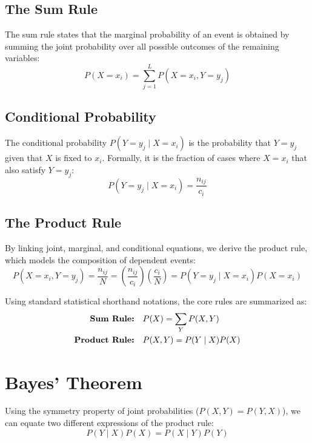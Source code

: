 \documentclass[11pt,a4paper]{article}
\begin{document}
\subsection{The Sum Rule}
The sum rule states that the marginal probability of an event is obtained by summing the joint probability over all possible outcomes of the remaining variables:
\begin{equation}
P(X=x_i) = \sum_{j=1}^{L} P(X=x_i, Y=y_j)
\end{equation}

\subsection{Conditional Probability}
The conditional probability $P(Y=y_j \mid X=x_i)$ is the probability that $Y = y_j$ given that $X$ is fixed to $x_i$. Formally, it is the fraction of cases where $X=x_i$ that also satisfy $Y=y_j$:
\begin{equation}
P(Y=y_j \mid X=x_i) = \frac{n_{ij}}{c_i}
\end{equation}

\subsection{The Product Rule}
By linking joint, marginal, and conditional equations, we derive the product rule, which models the composition of dependent events:
\begin{equation}
P(X=x_i, Y=y_j) = \frac{n_{ij}}{N} = \left(\frac{n_{ij}}{c_i}\right) \left(\frac{c_i}{N}\right) = P(Y=y_j \mid X=x_i)P(X=x_i)
\end{equation}

Using standard statistical shorthand notations, the core rules are summarized as:
\begin{align}
\text{\textbf{Sum Rule:}} \quad & P(X) = \sum_{Y} P(X, Y) \\
\text{\textbf{Product Rule:}} \quad & P(X, Y) = P(Y \mid X)P(X)
\end{align}

\section{Bayes' Theorem}
Using the symmetry property of joint probabilities ($P(X, Y) = P(Y, X)$), we can equate two different expressions of the product rule:
\begin{equation}
P(Y \mid X)P(X) = P(X \mid Y)P(Y)
\end{equation}
\end{document}

